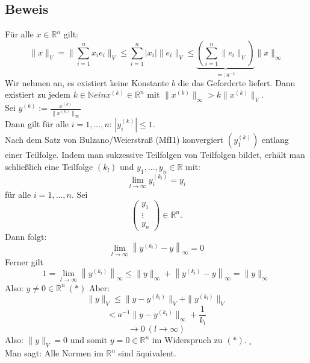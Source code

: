 \documentclass{scrbook}
\begin{document}
\subsection*{Beweis} 
Für alle $x\in \mathbb{R}^n$ gilt:
\[
\|x\|_V =
\|\sum^n_{i=1}x_ie_i\|_V
\leq \sum^n_{i=1} |x_i| \|e_i\|_V
\leq \underbrace{\left(
\sum^n_{i=1}\|e_i\|_V
\right)}_{=: a^{-1}}\|x\|_{\infty}
\]
Wir nehmen an, es existiert keine Konstante $b$ die das Geforderte liefert. Dann existiert zu jedem $k\in \mathbb{N} ein x^{(k)} \in\mathbb{R}^n$ mit $\|x^{(k)}\|_\infty > k\|x^{(k)}\|_V$.\\
Sei $y^{(k)}:=\frac{x^{(k)}}{\|x^{(k)}\|_\infty}$\\
Dann gilt für alle $i=1,...,n$: $\left| y^{(k)}_i\right| \leq 1$.\\
Nach dem Satz von Bulzano/Weierstraß (MfI1) konvergiert $(y_1^{(k)})$ entlang einer Teilfolge. Indem man sukzessive Teilfolgen von Teilfolgen bildet, erhält man schließlich eine Teilfolge $(k_l)$ und $y_1,...,y_n \in \mathbb{R}$ mit:\[\lim_{l\to \infty} y^{(k_l)}_i = y_i\] für alle $i=1,...,n$. Sei
\[
\left(
\begin{array}{c}
y_1\\\vdots\\y_n
\end{array}
\right)\in \mathbb{R}^n.
\]
Dann folgt:
\[
\lim_{l \to \infty} \left\|y^{\left(k_l\right)}-y\right\|_\infty = 0
\]
Ferner gilt
\[1= \lim_{l \to\infty} \left\|y^{\left(k_l\right)}\right\|_\infty
\leq \|y\|_\infty + \left\|y^{\left(k_l\right)}-y\right\|_\infty
= \|y\|_\infty
\]
Also: $y \neq 0 \in \mathbb{R}^n\ (*)$
Aber:
\[\|y\|_V \leq \|y-y^{(k_l)}\|_V+\|y^{(k_l)}\|_V\]
\[<a^{-1}\|y-y^{(k_l)}\|_\infty + \frac{1}{k_l}\]
\[
\rightarrow 0 \ (l \to \infty)
\]
Also: $\|y\|_V = 0$ und somit $y = 0 \in \mathbb{R}^n$ im Widerspruch zu $(*)$. $_\square$\\
Man sagt: Alle Normen im $\mathbb{R}^n$ sind äquivalent.
\end{document}
